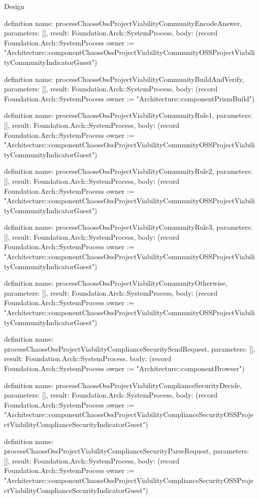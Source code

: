 \begin{lexlean}{Design}
\begin{semanticmodule}
definition{
  name: processChaossOssProjectViabilityCommunityEncodeAnswer,
  parameters: [],
  result: Foundation.Arch::SystemProcess,
  body: (record Foundation.Arch::SystemProcess {owner := "Architecture::componentChaossOssProjectViabilityCommunityOSSProjectViabilityCommunityIndicatorGuest"})
}

definition{
  name: processChaossOssProjectViabilityCommunityBuildAndVerify,
  parameters: [],
  result: Foundation.Arch::SystemProcess,
  body: (record Foundation.Arch::SystemProcess {owner := "Architecture::componentPrismBuild"})
}

definition{
  name: processChaossOssProjectViabilityCommunityRule1,
  parameters: [],
  result: Foundation.Arch::SystemProcess,
  body: (record Foundation.Arch::SystemProcess {owner := "Architecture::componentChaossOssProjectViabilityCommunityOSSProjectViabilityCommunityIndicatorGuest"})
}

definition{
  name: processChaossOssProjectViabilityCommunityRule2,
  parameters: [],
  result: Foundation.Arch::SystemProcess,
  body: (record Foundation.Arch::SystemProcess {owner := "Architecture::componentChaossOssProjectViabilityCommunityOSSProjectViabilityCommunityIndicatorGuest"})
}

definition{
  name: processChaossOssProjectViabilityCommunityRule3,
  parameters: [],
  result: Foundation.Arch::SystemProcess,
  body: (record Foundation.Arch::SystemProcess {owner := "Architecture::componentChaossOssProjectViabilityCommunityOSSProjectViabilityCommunityIndicatorGuest"})
}

definition{
  name: processChaossOssProjectViabilityCommunityOtherwise,
  parameters: [],
  result: Foundation.Arch::SystemProcess,
  body: (record Foundation.Arch::SystemProcess {owner := "Architecture::componentChaossOssProjectViabilityCommunityOSSProjectViabilityCommunityIndicatorGuest"})
}

definition{
  name: processChaossOssProjectViabilityComplianceSecuritySendRequest,
  parameters: [],
  result: Foundation.Arch::SystemProcess,
  body: (record Foundation.Arch::SystemProcess {owner := "Architecture::componentBrowser"})
}

definition{
  name: processChaossOssProjectViabilityComplianceSecurityDecide,
  parameters: [],
  result: Foundation.Arch::SystemProcess,
  body: (record Foundation.Arch::SystemProcess {owner := "Architecture::componentChaossOssProjectViabilityComplianceSecurityOSSProjectViabilityComplianceSecurityIndicatorGuest"})
}

definition{
  name: processChaossOssProjectViabilityComplianceSecurityParseRequest,
  parameters: [],
  result: Foundation.Arch::SystemProcess,
  body: (record Foundation.Arch::SystemProcess {owner := "Architecture::componentChaossOssProjectViabilityComplianceSecurityOSSProjectViabilityComplianceSecurityIndicatorGuest"})
}


\end{semanticmodule}
\end{lexlean}
